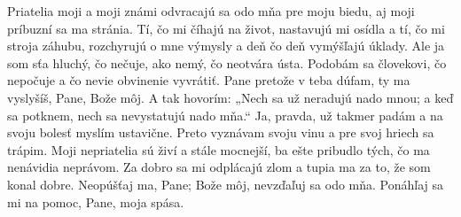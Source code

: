 Priatelia moji a moji známi
odvracajú sa odo mňa pre moju biedu,
\versseparator
aj moji príbuzní sa ma stránia.
Tí, čo mi číhajú na život, nastavujú mi osídla
\versseparator
a tí, čo mi stroja záhubu, rozchyrujú o mne výmysly
a deň čo deň vymýšľajú úklady.
\versseparator
Ale ja som sťa hluchý, čo nečuje,
ako nemý, čo neotvára ústa.
\versseparator
Podobám sa človekovi, čo nepočuje
a čo nevie obvinenie vyvrátiť.
\versseparator
Pane pretože v teba dúfam,
ty ma vyslyšíš, Pane, Bože môj.
\versseparator
A tak hovorím: „Nech sa už neradujú nado mnou;
a keď sa potknem,
nech sa nevystatujú nado mňa.“
\versseparator
Ja, pravda, už takmer padám
a na svoju bolesť myslím ustavične.
\versseparator
Preto vyznávam svoju vinu
a pre svoj hriech sa trápim.
\versseparator
Moji nepriatelia sú živí a stále mocnejší,
ba ešte pribudlo tých, čo ma nenávidia neprávom.
\versseparator
Za dobro sa mi odplácajú zlom a tupia ma za to,
že som konal dobre.
\versseparator
Neopúšťaj ma, Pane;
Bože môj, nevzďaľuj sa odo mňa.
\versseparator
Ponáhľaj sa mi na pomoc,
Pane, moja spása. 